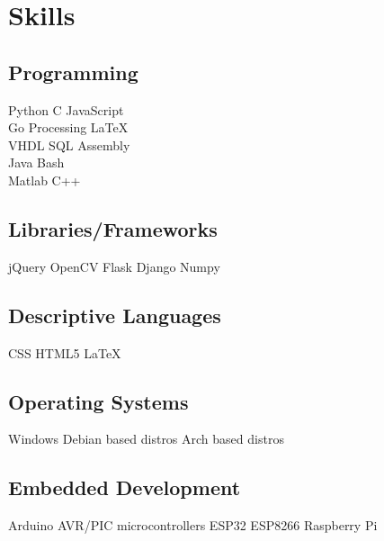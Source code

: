 \documentclass[]{plushcv}
\begin{document}
\begin{minipage}[t]{0.3\textwidth}


  \section{Skills}
  \subsection{Programming}
  \sectionsep
  Python \textbullet{} C \textbullet{} JavaScript  \\ Go \textbullet{} Processing \textbullet{} LaTeX \\
  \sectionsep
  VHDL \textbullet{} SQL \textbullet{} Assembly \\ Java \textbullet{} Bash \\
  \sectionsep
  Matlab \textbullet{} C++ \\
  \sectionsep
  \sectionsep
  \subsection{Libraries/Frameworks}
  \sectionsep
  jQuery \textbullet{} OpenCV \textbullet{} Flask \textbullet{} Django \textbullet{} Numpy \\
  \sectionsep
  \sectionsep
  \subsection{Descriptive Languages}
  \sectionsep
  CSS \textbullet{} HTML5 \textbullet{} \LaTeX
  \sectionsep
  \subsection{Operating Systems}
  \sectionsep
  Windows \textbullet{} Debian based distros \textbullet{} Arch based distros \\
  \sectionsep
  \sectionsep
  \subsection{Embedded Development}
  \sectionsep
  Arduino \textbullet{} AVR/PIC microcontrollers \textbullet{} ESP32 \textbullet{} ESP8266 \textbullet{} Raspberry Pi \\

  \sectionsep


\end{minipage}
\end{document}
